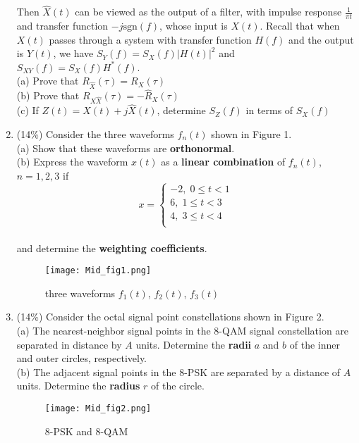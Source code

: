 \documentclass[a4paper,12pt]{article}
\begin{document}
\begin{enumerate}
            Then $\hat{X}(t)$ can be viewed as the output of a filter, with impulse response $\frac{1}{\pi t}$ and transfer function $- j \text{sgn}(f)$, whose input is $X(t)$. 
            Recall that when $X(t)$ passes through a system with transfer function $H(f)$ and the output is $Y(t)$, we have $S_Y(f) = S_X(f)|H(t)|^2$ and $S_{XY}(f) = S_X(f)H^*(f)$. \\
            (a) Prove that $R_{\hat{X}}(\tau) = R_{X}(\tau)$ \\
            (b) Prove that $R_{X\hat{X}}(\tau) = - \hat{R}_{X}(\tau)$ \\
            (c) If $Z(t) = X(t) + j \hat{X}(t)$, determine $S_Z(f)$ in terms of $S_X(f)$ \\
            \newpage
        \item (14\%) 
            Consider the three waveforms $f_n(t)$ shown in Figure 1. \\ 
            (a) Show that these waveforms are \textbf{orthonormal}. \\ 
            (b) Express the waveform $x(t)$  as a \textbf{linear combination} of $f_n(t)$, $n = 1, 2, 3$ if 
            $$x = \left\{ 
            \begin{aligned}
                -2, \; 0 \leq t < 1 \\
                 6, \; 1 \leq t < 3 \\ 
                 4, \; 3 \leq t < 4 \\
            \end{aligned}
            \right.
            $$ \\
            and determine the \textbf{weighting coefficients}.
            \begin{figure}[h]
            	\centering
            	\texttt{[image: Mid\_fig1.png]}
            	\caption{three waveforms $f_1(t)$, $f_2(t)$, $f_3(t)$}
            \end{figure}
        \item (14\%) 
            Consider the octal signal point constellations shown in Figure 2. \\ 
            (a) The nearest-neighbor signal points in the 8-QAM signal constellation are separated in distance by $A$ units. Determine the \textbf{radii} $a$ and $b$ of the inner and outer circles, respectively. \\
            (b) The adjacent signal points in the 8-PSK are separated by a distance of $A$ units. Determine the \textbf{radius} $r$ of the circle. \\
            \begin{figure}[h]
            	\centering
            	\texttt{[image: Mid\_fig2.png]}
            	\caption{8-PSK and 8-QAM}
            \end{figure}
            \newpage
            

\end{enumerate}
\end{document}

